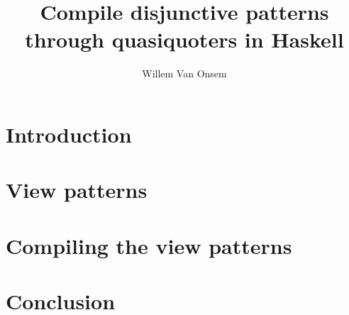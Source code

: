 \documentclass{article}
\title{Compile disjunctive patterns through quasiquoters in Haskell}
\author{Willem Van Onsem}
\begin{document}
\maketitle
\begin{abstract}
\end{abstract}
\section{Introduction}
\section{View patterns}
\section{Compiling the view patterns}

\section{Conclusion}
\end{document}
